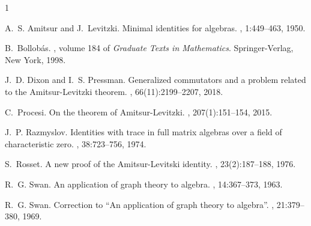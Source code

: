 \documentclass{amsproc}
\theoremstyle{definition}
\theoremstyle{remark}
\numberwithin{equation}{section}
\begin{document}
\begin{thebibliography}{1}

A.~S. Amitsur and J.~Levitzki.
\newblock Minimal identities for algebras.
, 1:449--463, 1950.

B.~Bollob\'{a}s.
, volume 184 of {\em Graduate Texts in
  Mathematics}.
\newblock Springer-Verlag, New York, 1998.

J.~D. Dixon and I.~S. Pressman.
\newblock Generalized commutators and a problem related to the
  {A}mitsur-{L}evitzki theorem.
, 66(11):2199--2207, 2018.

C.~Procesi.
\newblock On the theorem of {A}mitsur-{L}evitzki.
, 207(1):151--154, 2015.

J.~P. Razmyslov.
\newblock Identities with trace in full matrix algebras over a field of
  characteristic zero.
, 38:723--756, 1974.

S.~Rosset.
\newblock A new proof of the {A}mitsur-{L}evitski identity.
, 23(2):187--188, 1976.

R.~G. Swan.
\newblock An application of graph theory to algebra.
, 14:367--373, 1963.

R.~G. Swan.
\newblock Correction to ``{A}n application of graph theory to algebra''.
, 21:379--380, 1969.

\end{thebibliography}

% 
% 
\end{document}
